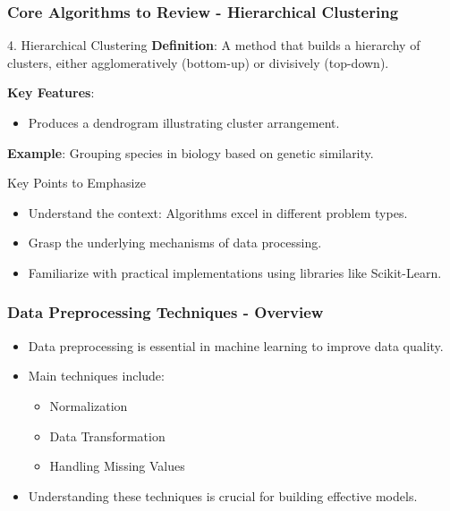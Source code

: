 \documentclass[aspectratio=169]{beamer}
\begin{document}
\begin{frame}[fragile]
    \frametitle{Core Algorithms to Review - Hierarchical Clustering}
    \begin{block}{4. Hierarchical Clustering}
        \textbf{Definition}: A method that builds a hierarchy of clusters, either agglomeratively (bottom-up) or divisively (top-down).
        
        \textbf{Key Features}:
        \begin{itemize}
            \item Produces a dendrogram illustrating cluster arrangement.
        \end{itemize}
        
        \textbf{Example}: Grouping species in biology based on genetic similarity.
    \end{block}

    \begin{block}{Key Points to Emphasize}
        \begin{itemize}
            \item Understand the context: Algorithms excel in different problem types.
            \item Grasp the underlying mechanisms of data processing.
            \item Familiarize with practical implementations using libraries like Scikit-Learn.
        \end{itemize}
    \end{block}
\end{frame}

\begin{frame}
  \frametitle{Data Preprocessing Techniques - Overview}
  \begin{itemize}
    \item Data preprocessing is essential in machine learning to improve data quality.
    \item Main techniques include:
      \begin{itemize}
        \item Normalization
        \item Data Transformation
        \item Handling Missing Values
      \end{itemize}
    \item Understanding these techniques is crucial for building effective models.
  \end{itemize}
\end{frame}
\end{document}

